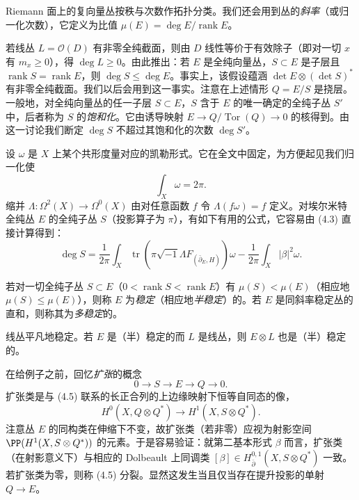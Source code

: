 Riemann 面上的复向量丛按秩与次数作拓扑分类。我们还会用到丛的\emph{斜率}（或归一化次数），它定义为比值 $\mu(E)=\deg E/\operatorname{rank}E$。

若线丛 $L=\mathcal{O}(D)$ 有非零全纯截面，则由 $D$ 线性等价于有效除子（即对一切 $x$ 有 $m_x\ge0$），得 $\deg L\ge0$。由此推出：若 $E$ 是全纯向量丛，$S\subset E$ 是子层且 $\operatorname{rank}S=\operatorname{rank}E$，则 $\deg S\le\deg E$。事实上，该假设蕴涵 $\det E\otimes(\det S)^*$ 有非零全纯截面。我们以后会用到这一事实。注意在上述情形 $Q=E/S$ 是挠层。一般地，对全纯向量丛的任一子层 $S\subset E$，$S$ 含于 $E$ 的唯一确定的全纯子丛 $S'$ 中，后者称为 $S$ 的\emph{饱和化}。它由诱导映射 $E\to Q/\operatorname{Tor}(Q)\to0$ 的核得到。由这一讨论我们断定 $\deg S$ 不超过其饱和化的次数 $\deg S'$。

设 $\omega$ 是 $X$ 上某个共形度量对应的凯勒形式。它在全文中固定，为方便起见我们归一化使
\[
\int_X\omega=2\pi .
\]
缩并 $\Lambda\colon\Omega^2(X)\to\Omega^0(X)$ 由对任意函数 $f$ 令 $\Lambda(f\omega)=f$ 定义。对埃尔米特全纯丛 $E$ 的全纯子丛 $S$（投影算子为 $\pi$），有如下有用的公式，它容易由 (4.3) 直接计算得到：
\begin{equation}
\deg S=\frac{1}{2\pi}\int_X\operatorname{tr}\left(\pi\sqrt{-1}\Lambda F_{(\bar\partial_E,H)}\right)\omega-\frac{1}{2\pi}\int_X|\beta|^2\omega .
\label{eq:4.4}\tag{4.4}
\end{equation}

\begin{definition}
若对一切全纯子丛 $S\subset E$（$0<\operatorname{rank}S<\operatorname{rank}E$）有 $\mu(S)<\mu(E)$（相应地 $\mu(S)\le\mu(E)$），则称 $E$ 为\emph{稳定}（相应地\emph{半稳定}）的。若 $E$ 是同斜率稳定丛的直和，则称其为\emph{多稳定}的。
\end{definition}

\begin{remark}
线丛平凡地稳定。若 $E$ 是（半）稳定的而 $L$ 是线丛，则 $E\otimes L$ 也是（半）稳定的。
\end{remark}

在给例子之前，回忆\emph{扩张}的概念
\begin{equation}
0\longrightarrow S\longrightarrow E\longrightarrow Q\longrightarrow0 .
\label{eq:4.5}\tag{4.5}
\end{equation}
扩张类是与 (4.5) 联系的长正合列的上边缘映射下恒等自同态的像，
\[
H^0(X,Q\otimes Q^*)\longrightarrow H^1(X,S\otimes Q^*).
\]
注意丛 $E$ 的同构类在伸缩下不变，故扩张类（若非零）应视为射影空间 $\PP(H^1(X,S\otimes Q^*))$ 的元素。于是容易验证：就第二基本形式 $\beta$ 而言，扩张类（在射影意义下）与相应的 Dolbeault 上同调类 $[\beta]\in H^{0,1}_{\bar\partial}(X,S\otimes Q^*)$ 一致。若扩张类为零，则称 (4.5) 分裂。显然这发生当且仅当存在提升投影的单射 $Q\to E$。

